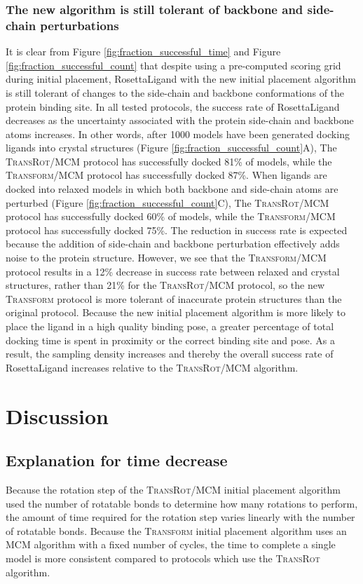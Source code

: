 \subsubsection{The new algorithm is still tolerant of backbone and side-chain perturbations}
It is clear from Figure \ref{fig:fraction_successful_time} and Figure \ref{fig:fraction_successful_count} that despite using a pre-computed scoring grid during initial placement, RosettaLigand with the new initial placement algorithm is still tolerant of changes to the side-chain and backbone conformations of the protein binding site. In all tested protocols, the success rate of RosettaLigand decreases as the uncertainty associated with the protein side-chain and backbone atoms increases.
In other words, after 1000 models have been generated docking ligands into crystal structures (Figure \ref{fig:fraction_successful_count}A), The \textsc{TransRot}/\ac{MCM} protocol has successfully docked 81\% of models, while the \textsc{Transform}/\ac{MCM} protocol has successfully docked 87\%.
When ligands are docked into relaxed models in which both backbone and side-chain atoms are perturbed (Figure \ref{fig:fraction_successful_count}C), The \textsc{TransRot}/\ac{MCM} protocol has successfully docked 60\% of models, while the \textsc{Transform}/\ac{MCM} protocol has successfully docked 75\%.
The reduction in success rate is expected because the addition of side-chain and backbone perturbation effectively adds noise to the protein structure.
However, we see that the \textsc{Transform}/\ac{MCM} protocol results in a 12\% decrease in success rate between relaxed and crystal structures, rather than 21\% for the \textsc{TransRot}/\ac{MCM} protocol, so the new \textsc{Transform} protocol is more tolerant of inaccurate protein structures than the original protocol.
Because the new initial placement algorithm is more likely to place the ligand in a high quality binding pose, a greater percentage of total docking time is spent in proximity or the correct binding site and pose.
As a result, the sampling density increases and thereby the overall success rate of RosettaLigand increases relative to the \textsc{TransRot}/\ac{MCM} algorithm.

\section{Discussion}

\subsection{Explanation for time decrease}
Because the rotation step of the \textsc{TransRot}/\ac{MCM} initial placement algorithm used the number of rotatable bonds to determine how many rotations to perform, the amount of time required for the rotation step varies linearly with the number of rotatable bonds.
Because the \textsc{Transform} initial placement algorithm uses an \ac{MCM} algorithm with a fixed number of cycles, the time to complete a single model is more consistent compared to protocols which use the \textsc{TransRot} algorithm.  

